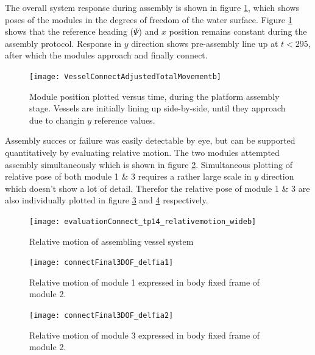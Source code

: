 The overall system response during assembly is shown in figure \ref{AssemblyGoodGlobal_tp14}, which shows poses of the modules in the degrees of freedom of the water surface. Figure \ref{AssemblyGoodGlobal_tp14} shows that the reference heading ($\Psi$) and $x$ position remains constant during the assembly protocol. Response in $y$ direction shows pre-assembly line up at $t<295$, after which the modules approach and finally connect.  

\begin{figure}[H]
	\centering
	\captionsetup{justification=centering}
	\texttt{[image: VesselConnectAdjustedTotalMovementb]}
	\caption{Module position plotted versus time, during the platform assembly stage. Vessels are initially lining up side-by-side, until they approach due to changin $y$ reference values. }
	\label{AssemblyGoodGlobal_tp14}
\end{figure}

Assembly succes or failure was easily detectable by eye, but can be supported quantitatively by evaluating relative motion. The two modules attempted assembly simultaneously which is shown in figure \ref{AssemblyGoodrelative_tp14}. Simultaneous plotting of relative pose of both module 1 \& 3 requires a rather large scale in $y$ direction which doesn't show a lot of detail. Therefor the relative pose of module 1 \& 3 are also individually plotted in figure \ref{connectFinal3DOF_delfia1} and \ref{connectFinal3DOF_delfia2} respectively.

\begin{figure}[H]
	\centering
	\captionsetup{justification=centering}
	\texttt{[image: evaluationConnect\_tp14\_relativemotion\_wideb]}%
	\caption{Relative motion of assembling vessel system}
	\label{AssemblyGoodrelative_tp14}
\end{figure} 

 \begin{figure}[H]
 	\centering
 	\captionsetup{justification=centering}
 	\texttt{[image: connectFinal3DOF\_delfia1]}%
 	\caption{Relative motion of module 1 expressed in body fixed frame of module 2. }
 	\label{connectFinal3DOF_delfia1}
 \end{figure}

 \begin{figure}[H]
 	\centering
 	\captionsetup{justification=centering}
	\texttt{[image: connectFinal3DOF\_delfia2]}%
	\caption{Relative motion of module 3 expressed in body fixed frame of module 2.}
	\label{connectFinal3DOF_delfia2}
\end{figure}

